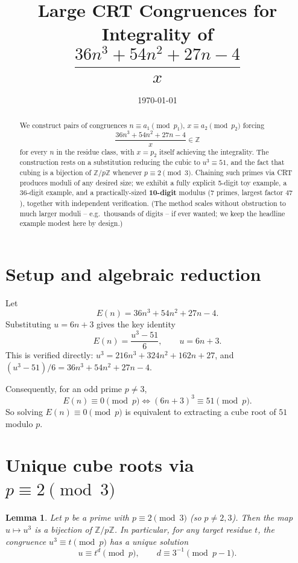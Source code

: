 \documentclass[11pt]{article}
\title{Large CRT Congruences for Integrality of \\
$\dfrac{36n^3+54n^2+27n-4}{x}$}
\author{}
\date{\today}
\newtheorem{lemma}{Lemma}
\begin{document}
\maketitle

\begin{abstract}
We construct pairs of congruences $n \equiv a_1 \pmod{p_1}$, $x \equiv a_2
\pmod{p_2}$ forcing
\[
\frac{36n^3+54n^2+27n-4}{x} \in \mathbb{Z}
\]
for every $n$ in the residue class, with $x=p_2$ itself achieving the
integrality. The construction rests on a substitution reducing the cubic
to $u^3 \equiv 51$, and the fact that cubing is a bijection of
$\mathbb{Z}/p\mathbb{Z}$ whenever $p \equiv 2 \pmod 3$. Chaining such primes
via CRT produces moduli of any desired size; we exhibit a fully explicit
5-digit toy example, a 36-digit example, and a practically-sized
\textbf{10-digit} modulus (7 primes, largest factor $47$), together with
independent verification. (The method scales without obstruction to
much larger moduli -- e.g.\ thousands of digits -- if ever wanted; we
keep the headline example modest here by design.)
\end{abstract}

\section{Setup and algebraic reduction}

Let
\[
E(n) = 36n^3 + 54n^2 + 27n - 4 .
\]
Substituting $u = 6n+3$ gives the key identity
\[
E(n) = \frac{u^3 - 51}{6}, \qquad u = 6n+3.
\]
This is verified directly: $u^3 = 216n^3+324n^2+162n+27$, and
$(u^3-51)/6 = 36n^3+54n^2+27n-4$.

Consequently, for an odd prime $p \neq 3$,
\[
E(n) \equiv 0 \pmod p \iff (6n+3)^3 \equiv 51 \pmod p .
\]
So solving $E(n)\equiv 0 \pmod p$ is equivalent to extracting a cube root
of $51$ modulo $p$.

\section{Unique cube roots via $p \equiv 2 \pmod 3$}

\begin{lemma}
Let $p$ be a prime with $p \equiv 2 \pmod 3$ (so $p \ne 2, 3$). Then the
map $u \mapsto u^3$ is a bijection of $\mathbb{Z}/p\mathbb{Z}$. In
particular, for any target residue $t$, the congruence $u^3 \equiv t
\pmod p$ has a unique solution
\[
u \equiv t^{d} \pmod p, \qquad d \equiv 3^{-1} \pmod{p-1}.
\]
\end{lemma}
\end{document}

